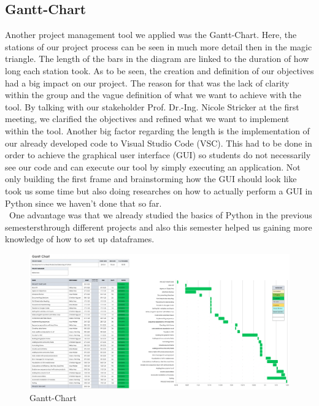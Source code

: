 \subsection{Gantt-Chart}
Another project management tool we applied was the Gantt-Chart. Here, the stations of our project process can be seen in much more detail then in the magic triangle. The length of the bars in the diagram are linked to the duration of how long each station took. As to be seen, the creation and definition of our objectives had a big impact on our project. The reason for that was the lack of clarity within the group and the vague definition of what we want to achieve with the tool. By talking with our stakeholder Prof. Dr.-Ing. Nicole Stricker at the first meeting, we clarified the objectives and refined what we want to implement within the tool. Another big factor regarding the length is the implementation of our already developed code to Visual Studio Code (VSC). This had to be done in order to achieve the graphical user interface (GUI) so students do not necessarily see our code and can execute our tool by simply executing an application. Not only building the first frame and brainstorming how the GUI should look like took us some time but also doing researches on how to actually perform a GUI in Python since we haven't done that so far. \\ One advantage was that we already studied the basics of Python in the previous semestersthrough different projects and also this semester helped us gaining more knowledge of how to set up dataframes. 
\begin{figure}[H]
\includegraphics[width=\linewidth]{Abbildungen/Gantt_Chart.png}
\vspace{-0.7cm}
\caption{Gantt-Chart}
\label{fig:Gantt_Chart}
\end{figure}
\vspace{-1cm}

